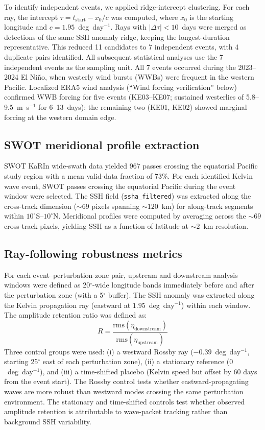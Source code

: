 \documentclass[11pt]{article}
\begin{document}
To identify independent events, we applied ridge-intercept clustering. For each ray, the intercept $\tau = t_\mathrm{start} - x_0/c$ was computed, where $x_0$ is the starting longitude and $c = 1.95$~deg~day$^{-1}$. Rays with $|\Delta\tau| < 10$~days were merged as detections of the same SSH anomaly ridge, keeping the longest-duration representative. This reduced 11 candidates to 7 independent events, with 4 duplicate pairs identified. All subsequent statistical analyses use the 7 independent events as the sampling unit. All 7 events occurred during the 2023--2024 El Ni\~no, when westerly wind bursts (WWBs) were frequent in the western Pacific\cite{McPhaden1987}. Localized ERA5 wind analysis (``Wind forcing verification'' below) confirmed WWB forcing for five events (KE03--KE07; sustained westerlies of 5.8--9.5~m~s$^{-1}$ for 6--13~days); the remaining two (KE01, KE02) showed marginal forcing at the western domain edge.

\subsection{SWOT meridional profile extraction}

SWOT KaRIn wide-swath data yielded 967 passes crossing the equatorial Pacific study region with a mean valid-data fraction of 73\%. For each identified Kelvin wave event, SWOT passes crossing the equatorial Pacific during the event window were selected. The SSH field (\texttt{ssha\_filtered}) was extracted along the cross-track dimension (${\sim}69$ pixels spanning ${\sim}120$~km) for along-track segments within $10^\circ$S--$10^\circ$N. Meridional profiles were computed by averaging across the ${\sim}69$ cross-track pixels, yielding SSH as a function of latitude at ${\sim}2$~km resolution.

\subsection{Ray-following robustness metrics}

For each event--perturbation-zone pair, upstream and downstream analysis windows were defined as 20$^\circ$-wide longitude bands immediately before and after the perturbation zone (with a 5$^\circ$ buffer). The SSH anomaly was extracted along the Kelvin propagation ray (eastward at $1.95$~deg~day$^{-1}$) within each window. The amplitude retention ratio was defined as:
\begin{equation}
R = \frac{\mathrm{rms}(\eta_\mathrm{downstream})}{\mathrm{rms}(\eta_\mathrm{upstream})}
\end{equation}
Three control groups were used: (i) a westward Rossby ray ($-0.39$~deg~day$^{-1}$, starting 25$^\circ$ east of each perturbation zone), (ii) a stationary reference ($0$~deg~day$^{-1}$), and (iii) a time-shifted placebo (Kelvin speed but offset by 60 days from the event start). The Rossby control tests whether eastward-propagating waves are more robust than westward modes crossing the same perturbation environment. The stationary and time-shifted controls test whether observed amplitude retention is attributable to wave-packet tracking rather than background SSH variability.
\end{document}
